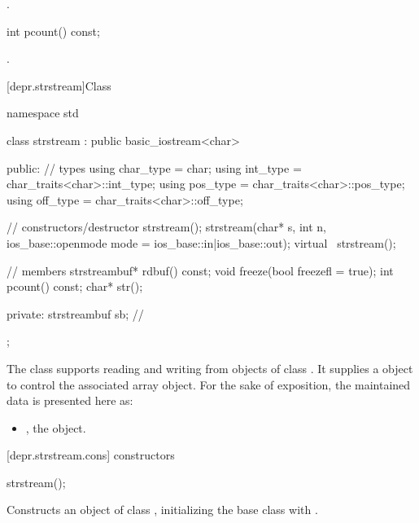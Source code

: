 \begin{itemdescr}
\pnum
\returns
{}.
\end{itemdescr}

%
\begin{itemdecl}
int pcount() const;
\end{itemdecl}

\begin{itemdescr}
\pnum
\returns
{}.
\end{itemdescr}

[depr.strstream]{Class }

%
\begin{codeblock}
namespace std {
  class strstream
    : public basic_iostream<char> {
  public:
    // types
    using char_type = char;
    using int_type  = char_traits<char>::int_type;
    using pos_type  = char_traits<char>::pos_type;
    using off_type  = char_traits<char>::off_type;

    // constructors/destructor
    strstream();
    strstream(char* s, int n,
              ios_base::openmode mode = ios_base::in|ios_base::out);
    virtual ~strstream();

    // members
    strstreambuf* rdbuf() const;
    void freeze(bool freezefl = true);
    int pcount() const;
    char* str();

  private:
  strstreambuf sb;  // \expos
  };
}
\end{codeblock}

\pnum
The class
supports reading and writing from objects of class
.
It supplies a
object to control the associated array object.
For the sake of exposition, the maintained data is presented here as:

\begin{itemize}
\item
{}, the  object.
\end{itemize}

[depr.strstream.cons]{ constructors}

%
\begin{itemdecl}
strstream();
\end{itemdecl}

\begin{itemdescr}
\pnum
\effects
Constructs an object of class
,
initializing the base class with
.
\end{itemdescr}


